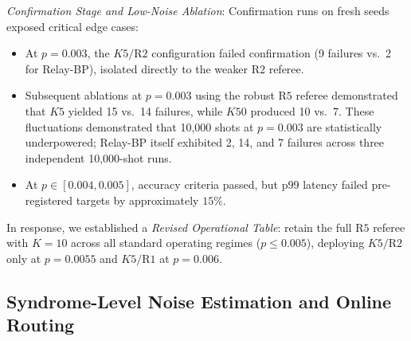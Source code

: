 \textit{Confirmation Stage and Low-Noise Ablation}: Confirmation runs on fresh seeds exposed critical edge cases:
\begin{itemize}
    \item At $p = 0.003$, the $K5/\text{R2}$ configuration failed confirmation (9 failures vs.\ 2 for Relay-BP), isolated directly to the weaker $\text{R2}$ referee.
    \item Subsequent ablations at $p = 0.003$ using the robust $\text{R5}$ referee demonstrated that $K5$ yielded 15 vs.\ 14 failures, while $K50$ produced 10 vs.\ 7. These fluctuations demonstrated that 10,000 shots at $p = 0.003$ are statistically underpowered; Relay-BP itself exhibited 2, 14, and 7 failures across three independent 10,000-shot runs.
    \item At $p \in [0.004, 0.005]$, accuracy criteria passed, but p99 latency failed pre-registered targets by approximately $15\%$.
\end{itemize}

In response, we established a \textit{Revised Operational Table}: retain the full $\text{R5}$ referee with $K = 10$ across all standard operating regimes ($p \le 0.005$), deploying $K5/\text{R2}$ only at $p = 0.0055$ and $K5/\text{R1}$ at $p = 0.006$.

\subsection{Syndrome-Level Noise Estimation and Online Routing}

